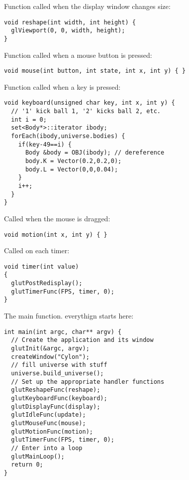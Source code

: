 \noindent
Function called when the display window changes size: \begin{lstlisting}
void reshape(int width, int height) {
  glViewport(0, 0, width, height);
}
\end{lstlisting}
\noindent
Function called when a mouse button is pressed: \begin{lstlisting}
void mouse(int button, int state, int x, int y) { }
\end{lstlisting}
\noindent
Function called when a key is pressed: \begin{lstlisting}
void keyboard(unsigned char key, int x, int y) {
  // '1' kick ball 1, '2' kicks ball 2, etc.
  int i = 0;
  set<Body*>::iterator ibody;
  forEach(ibody,universe.bodies) {
    if(key-49==i) {
      Body &body = OBJ(ibody); // dereference
      body.K = Vector(0.2,0.2,0);
      body.L = Vector(0,0,0.04);
    }
    i++;
  }
}
\end{lstlisting}
\noindent
Called when the mouse is dragged: \begin{lstlisting}
void motion(int x, int y) { }
\end{lstlisting}
\noindent
Called on each timer: \begin{lstlisting}
void timer(int value)
{
  glutPostRedisplay();
  glutTimerFunc(FPS, timer, 0);
}
\end{lstlisting}
\noindent
The main function. everythign starts here: \begin{lstlisting}
int main(int argc, char** argv) {
  // Create the application and its window
  glutInit(&argc, argv);
  createWindow("Cylon");
  // fill universe with stuff
  universe.build_universe();
  // Set up the appropriate handler functions
  glutReshapeFunc(reshape);
  glutKeyboardFunc(keyboard);
  glutDisplayFunc(display);
  glutIdleFunc(update);
  glutMouseFunc(mouse);
  glutMotionFunc(motion);  
  glutTimerFunc(FPS, timer, 0);
  // Enter into a loop
  glutMainLoop();  
  return 0;
}
\end{lstlisting}
